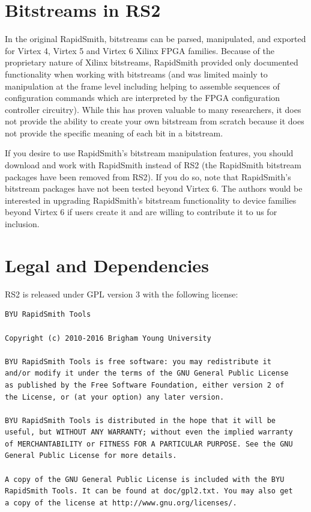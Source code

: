 \documentclass[10pt]{article}
\begin{document}
\pagebreak
\section{Bitstreams in RS2}

In the original RapidSmith, bitstreams can be parsed, manipulated, and exported
for Virtex 4, Virtex 5 and Virtex 6 Xilinx FPGA families.  Because of the
proprietary nature of Xilinx bitstreams, RapidSmith provided only documented
functionality when working with bitstreams (and was limited mainly to
manipulation at the frame level including helping to assemble sequences of
configuration commands which are interpreted by the FPGA configuration
controller circuitry).  While this has proven valuable to many researchers, it
does not provide the ability to create your own bitstream from scratch because
it does not provide the specific meaning of each bit in a bitstream.

If you desire to use RapidSmith's bitstream manipulation features, you should
download and work with RapidSmith instead of RS2 (the RapidSmith bitstream
packages have been removed from RS2).  If you do so, note that RapidSmith's
bitstream packages have not been tested beyond Virtex 6.  The authors would be
interested in upgrading RapidSmith's bitstream functionality to device families
beyond Virtex 6 if users create it and are willing to contribute it to us for
inclusion.

\pagebreak
\section{Legal and Dependencies}
RS2 is released under GPL version 3 with the following license: 

\begin{verbatim}
BYU RapidSmith Tools

Copyright (c) 2010-2016 Brigham Young University
   
BYU RapidSmith Tools is free software: you may redistribute it
and/or modify it under the terms of the GNU General Public License
as published by the Free Software Foundation, either version 2 of
the License, or (at your option) any later version.
   
BYU RapidSmith Tools is distributed in the hope that it will be
useful, but WITHOUT ANY WARRANTY; without even the implied warranty
of MERCHANTABILITY or FITNESS FOR A PARTICULAR PURPOSE. See the GNU
General Public License for more details.
   
A copy of the GNU General Public License is included with the BYU
RapidSmith Tools. It can be found at doc/gpl2.txt. You may also get
a copy of the license at http://www.gnu.org/licenses/.
\end{verbatim}
\end{document}
